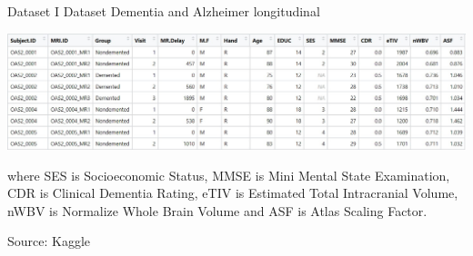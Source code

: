 \documentclass{beamer}
\begin{document}
\begin{frame}{Dataset I}
	Dataset Dementia and Alzheimer longitudinal
	\begin{center}%
		
		
		\includegraphics[width=\columnwidth]{dataset_al.jpeg}
	\end{center}
	
	where SES is Socioeconomic Status, MMSE is Mini Mental State Examination, CDR is Clinical Dementia Rating, eTIV is Estimated Total Intracranial Volume, nWBV is Normalize Whole Brain Volume and ASF is Atlas Scaling Factor.
	
	\vspace{0.1 cm}
	Source: Kaggle
	
\end{frame}
\end{document}
